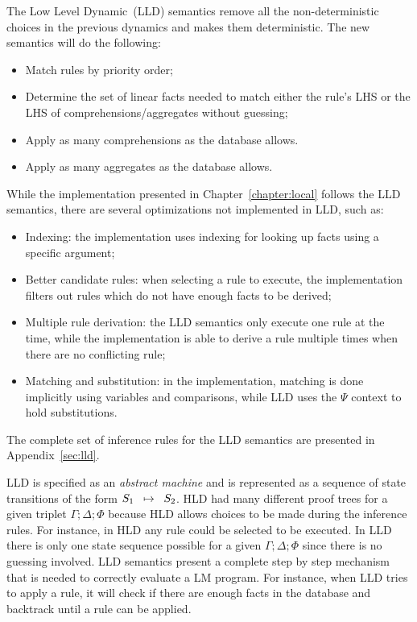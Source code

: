 The Low Level Dynamic~(LLD) semantics remove all the non-deterministic choices
in the previous dynamics and makes them deterministic. The new semantics will do
the following:

\begin{itemize}

   \item Match rules by priority order;

   \item Determine the set of linear facts needed to match either the rule's LHS
      or the LHS of comprehensions/aggregates without guessing;

   \item Apply as many comprehensions as the database allows.

   \item Apply as many aggregates as the database allows.

\end{itemize}

While the implementation presented in Chapter~\ref{chapter:local} follows the
LLD semantics, there are several optimizations not implemented in LLD, such as:

\begin{itemize}
   \item Indexing: the implementation uses indexing for looking up facts using a
      specific argument;
   \item Better candidate rules: when selecting a rule to execute, the
      implementation filters out rules which do not have enough facts to be
      derived;
   \item Multiple rule derivation: the LLD semantics only execute one rule at
      the time, while the implementation is able to derive a rule multiple times
      when there are no conflicting rule;
   \item Matching and substitution: in the implementation, matching is done
      implicitly using variables and comparisons, while LLD uses the $\Psi$
      context to hold substitutions.
\end{itemize}

The complete set of inference rules for the LLD semantics are presented in
Appendix~\ref{sec:lld}.

LLD is specified as an \emph{abstract machine} and is represented as a sequence
of state transitions of the form $S_1 \;\; \mapsto \;\; S_2$. HLD had many different
proof trees for a given triplet $\Gamma; \Delta; \Phi$ because HLD allows
choices to be made during the inference rules. For instance, in HLD any rule
could be selected to be executed. In LLD there is only one state sequence
possible for a given $\Gamma; \Delta; \Phi$ since there is no guessing involved.
LLD semantics present a complete step by step mechanism that is needed to
correctly evaluate a LM program. For instance, when LLD tries to apply a rule,
it will check if there are enough facts in the database and backtrack until a
rule can be applied.

